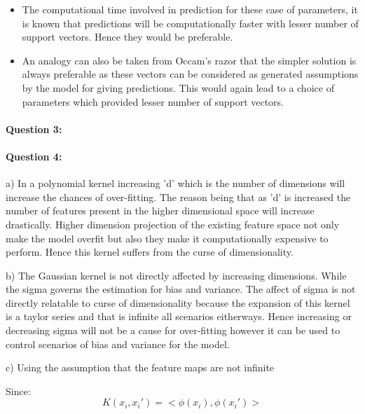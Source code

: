 \documentclass[letterpaper,11pt]{article}
\begin{document}
\begin{itemize}
	\item The computational time involved in prediction for these case of parameters, it is known that predictions will be computationally faster with lesser number of support vectors. Hence they would be preferable.
\end{itemize}

\begin{itemize}
	\item An analogy can also be taken from Occam's razor that the simpler solution is always preferable as these vectors can be considered as generated assumptions by the model for giving predictions. This would again lead to a choice of parameters which provided lesser number of support vectors.
	
\end{itemize}

\paragraph{Question 3:}

\paragraph{Question 4:}


a) In a polynomial kernel increasing 'd' which is the number of dimensions will increase the chances of over-fitting. The reason being that as 'd' is increased the number of features present in the higher dimensional space will increase drastically. Higher dimension projection of the existing feature space not only make the model overfit but also they make it computationally expensive to perform. Hence this kernel suffers from the curse of dimensionality.


b) The Gaussian kernel is not directly affected by increasing dimensions. While the sigma governs the estimation for bias and variance. The affect of sigma is not directly relatable to curse of dimensionality because the expansion of this kernel is a taylor series and that is infinite all scenarios eitherways. Hence increasing or decreasing sigma will not be a cause for over-fitting however it can be used to control scenarios of bias and variance for the model.


c) Using the assumption that the feature maps are not infinite

Since: \begin{equation} K(x_i,x_i') = <\phi(x_i),\phi(x_i')> \end{equation}
\end{document}

